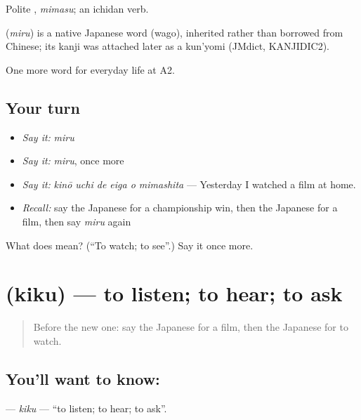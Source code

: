 Polite \textbf{}, \emph{mimasu}; an ichidan verb.

\begin{cousinweb}
\textbf{} (\emph{miru}) is a native Japanese word (wago), inherited rather than borrowed from Chinese; its kanji was attached later as a kun'yomi (JMdict, KANJIDIC2).
\end{cousinweb}

\begin{grammarlens}[title={What you've built}]
One more word for everyday life at A2.
\end{grammarlens}

\subsection*{Your turn}
\begin{itemize}
\raggedright
  \item \emph{Say it:} \emph{miru}
  \item \emph{Say it:} \emph{miru}, once more
  \item \emph{Say it:} \emph{kinō uchi de eiga o mimashita} — Yesterday I watched a film at home.
  \item \emph{Recall:} say the Japanese for a championship win, then the Japanese for a film, then say \emph{miru} again
\end{itemize}

\begin{tcolorbox}[breakable,colback=teal!4,colframe=teal!35!black,title={Before you move on}]
What does  mean? (\textquotedblleft{}To watch; to see\textquotedblright{}.) Say it once more.
\end{tcolorbox}
\section[\texorpdfstring{\ja{きく} (kiku)}{きく (kiku)}]{ (kiku) — to listen; to hear; to ask}

\label{lesson:JA-C236-kiku}



\begin{quote}
Before the new one: say the Japanese for a film, then the Japanese for to watch.
\end{quote}

\subsection*{You'll want to know: }
\textbf{} — \emph{kiku} — \textquotedblleft{}to listen; to hear; to ask\textquotedblright{}.


